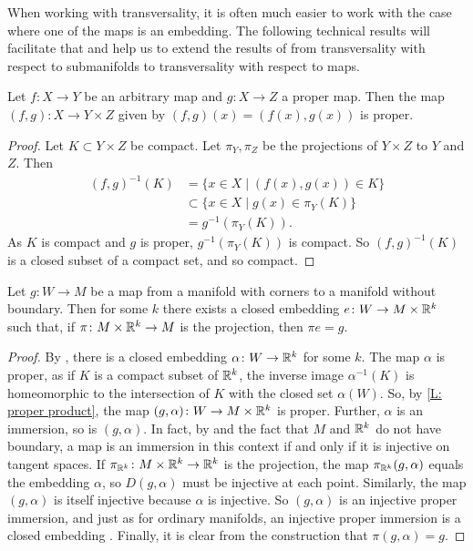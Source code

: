 When working with transversality, it is often much easier to work with the case where one of the maps is an embedding.
The following technical results will facilitate that and help us to extend the results of \cite{GuPo74} from transversality with respect to submanifolds to transversality with respect to maps.

\begin{lemma}\label{L: proper product}
	Let $f \colon X \to Y$ be an arbitrary map and $g \colon X \to Z$ a proper map.
	Then the map $(f,g) \colon X \to Y \times Z$ given by $(f,g)(x)=(f(x),g(x))$ is proper.
\end{lemma}

\begin{proof}
	Let $K \subset Y \times Z$ be compact.
	Let $\pi_Y,\pi_Z$ be the projections of $Y \times Z$ to $Y$ and $Z$. Then
	\begin{align*}
		(f,g)^{-1}(K) &= \{x \in X \mid (f(x),g(x)) \in K \}\\
		&\subset \{ x \in X \mid g(x) \in \pi_Y(K)\}\\
		&= g^{-1}(\pi_Y(K)).
	\end{align*}
	As $K$ is compact and $g$ is proper, $g^{-1}(\pi_Y(K))$ is compact.
	So $(f,g)^{-1}(K)$ is a closed subset of a compact set, and so compact.
\end{proof}

\begin{corollary}\label{C: embed V}
Let $g \colon W \to M$ be a map from a manifold with corners to a manifold without boundary.
Then for some $k$ there exists a closed embedding $e \colon W \to M \times \mathbb{R}^k$ such that, if $\pi \colon M \times \mathbb{R}^k \to M$ is the projection, then $\pi e = g$.
\end{corollary}

\begin{proof}
	By \cite[Corollary 11.3.10]{MaDo92}, there is a closed embedding $\alpha \colon W \to \mathbb{R}^k$ for some $k$.
	The map $\alpha$ is proper, as if $K$ is a compact subset of $\mathbb{R}^k$, the inverse image $\alpha^{-1}(K)$ is homeomorphic to the intersection of $K$ with the closed set $\alpha(W)$.
	So, by \cref{L: proper product}, the map $(g,\alpha) \colon W \to M \times \mathbb{R}^k$ is proper.
	Further, $\alpha$ is an immersion, so is $(g,\alpha)$.
	In fact, by \cite[Theorem 3.2.6]{MaDo92} and the fact that $M$ and $\mathbb{R}^k$ do not have boundary, a map is an immersion in this context if and only if it is injective on tangent spaces.
	If $\pi_{\mathbb{R}^k} \colon M \times \mathbb{R}^k \to \mathbb{R}^k$ is the projection, the map $\pi_{\mathbb{R}^k}(g,\alpha)$ equals the embedding $\alpha$, so $D(g,\alpha)$ must be injective at each point.
	Similarly, the map $(g,\alpha)$ is itself injective because $\alpha$ is injective.
	So $(g,\alpha)$ is an injective proper immersion, and just as for ordinary manifolds, an injective proper immersion is a closed embedding \cite[Proposition 3.3.4]{MaDo92}.
	Finally, it is clear from the construction that $\pi (g,\alpha) = g$.
\end{proof}

